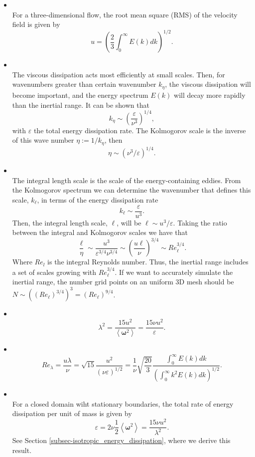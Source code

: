 \begin{itemize}
\item{}\\ For a three-dimensional flow, the root mean square (RMS) of the velocity field is given by
$$u=\left(\frac{2}{3}\int_0^\infty E(k)dk\right)^{1/2}.$$
\item{}\\The viscous dissipation acts most efficiently at small scales. Then, for wavenumbers greater than certain wavenumber $k_\eta$, the viscous dissipation will become important, and the energy spectrum $E(k)$ will decay more rapidly than the inertial range. It can be shown that $$k_\eta\sim\left(\frac{\varepsilon}{\nu^3}\right)^{1/4},$$ with $\varepsilon$ the total energy dissipation rate. The Kolmogorov scale is the inverse of this wave number $\eta:=1/k_\eta$, then $$\eta\sim\left(\nu^3/\varepsilon\right)^{1/4}.$$
\item{}\\The integral length scale is the scale of the energy-containing eddies. From the Kolmogorov spectrum  we can determine the wavenumber that defines this scale, $k_\ell$, in terms of the energy dissipation rate  $$k_\ell\sim\frac{\varepsilon}{u^3}.$$ Then, the integral length scale, $\ell$, will be $\ell\sim u^3/\varepsilon$. Taking the ratio between the integral and Kolmogorov scales we have that
$$\frac{\ell}{\eta}\sim\frac{u^3}{\varepsilon^{3/4}\nu^{3/4}}\sim\left(\frac{u\ell}{\nu}\right)^{3/4}\sim Re_\ell^{3/4}.$$
Where $Re_l$ is the integral Reynolds number. Thus, the inertial range includes a set of scales growing with $Re_\ell^{3/4}$. If we want to accurately simulate the inertial range, the number grid points on an uniform 3D mesh should be $N\sim\left((Re_\ell)^{3/4}\right)^3=(Re_\ell)^{9/4}$. 
\item{}\\$$\lambda^2=\frac{15u^2}{\left\langle\boldsymbol{\omega}^2\right\rangle}=\frac{15\nu u^2}{\varepsilon}.$$
\item{}\\$$Re_\lambda=\frac{u\lambda}{\nu}=\sqrt{15}\frac{u^2}{\left(\nu\varepsilon\right)^{1/2}}=\frac{1}{\nu}\sqrt{\frac{20}{3}}\frac{\int_0^\infty E(k)dk}{\left(\int_0^\infty k^2E(k)dk\right)^{1/2}}.$$
\item{}\\For a closed domain wiht stationary boundaries, the total rate of energy dissipation per unit of mass is given by
$$\varepsilon=2\nu\frac{1}{2}\left\langle\boldsymbol{\omega}^2\right\rangle=\frac{15\nu u^2}{\lambda^2}.$$
See Section \ref{subsec-isotropic_energy_dissipation}, where we derive this result.
\end{itemize}


